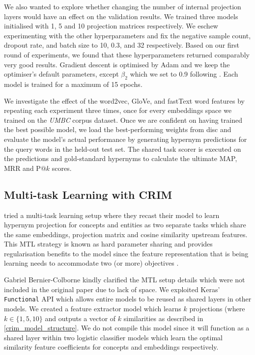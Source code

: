 We also wanted to explore whether changing the number of internal projection layers would have an effect on the validation results.  We trained three models initialised with 1, 5 and 10 projection matrices respectively.  We eschew experimenting with the other hyperparameters and fix the negative sample count, dropout rate, and batch size to 10, 0.3, and 32 respectively.  Based on our first round of experiments, we found that these hyperparameters returned comparably very good results.  Gradient descent is optimised by Adam \citep{kingma2014adam} and we keep the optimiser's default parameters, except $\beta_2$ which we set to 0.9 following \citep{bernier2018crim}.  Each model is trained for a maximum of 15 epochs.

We investigate the effect of the word2vec, GloVe, and fastText word features by repeating each experiment three times, once for every embeddings space we trained on the \textit{UMBC} corpus dataset.  Once we are confident on having trained the best possible model, we load the best-performing weights from disc and  evaluate the model's actual performance by generating hypernym predictions for the query words in the held-out test set.  The shared task scorer is executed on the predictions and gold-standard hypernyms to calculate the ultimate \ac{MAP}, \ac{MRR} and P$@k$ scores.

\subsection{Multi-task Learning with CRIM}
\citet{bernier2018crim} tried a multi-task learning setup where they recast their model to learn hypernym projection for concepts and entities as two separate tasks which share the same embeddings, projection matrix and cosine similarity upstream features.  This \ac{MTL} strategy is known as hard parameter sharing and provides regularisation benefits to the model since the feature representation that is being learning needs to accommodate two (or more) objectives \citep{ruder2017overview}.

Gabriel Bernier-Colborne kindly clarified the \ac{MTL} setup details which were not included in the original paper due to lack of space.  We exploited Keras' \texttt{Functional} API which allows entire models to be reused as shared layers in other models.  We created a feature extractor model which learns $k$ projections (where $k \in \{1, 5, 10\}$  and outputs a vector of $k$ similarities as described in \cref{crim_model_structure}.  We do not compile this model since it will function as a shared layer within two logistic classifier models which learn the optimal similarity feature coefficients for concepts and embeddings respectively.

